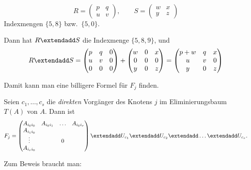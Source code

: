 \begin{bsp}
\begin{equation*}
 R
 =
 \begin{pmatrix}
  p & q \\
  u & v
 \end{pmatrix},
 \qquad
 S
 =
 \begin{pmatrix}
  w & x \\
  y & z
 \end{pmatrix}
\end{equation*}
Indexmengen $\{5,8\}$ bzw.\ $\{5,0\}$.

Dann hat $R \extendadd S$ die Indexmenge $\lbrace 5,8,9 \rbrace$, und
\begin{equation*}
 R \extendadd S
 =
 \begin{pmatrix}
  p & q & 0 \\
  u & v & 0 \\
  0 & 0 & 0
 \end{pmatrix}
 +
 \begin{pmatrix}
  w & 0 & x \\
  0 & 0 & 0 \\
  y & 0 & z
 \end{pmatrix}
 =
 \begin{pmatrix}
  p+w & q & x \\
  u & v & 0 \\
  y & 0 & z
 \end{pmatrix}
\end{equation*}
\end{bsp}
Damit kann man eine billigere Formel für $F_j$ finden.
\begin{satz}
\label{thm:frontal_matrix_children}
Seien $c_1, \ldots,c_s$ die \emph{direkten} Vorgänger des Knotens $j$ im Eliminierungsbaum $T(A)$ von $A$. Dann ist
\begin{equation*}
 F_j
 =
 \begin{pmatrix}
  A_{{i_0}{i_0}} & A_{{i_0}{i_1}} & \ldots & A_{{i_0}{i_r}} \\
  A_{{i_1}{i_0}} \\
  \vdots & & 0 \\
  A_{{i_r}{i_0}}
 \end{pmatrix} \extendadd U_{c_1} \extendadd U_{c_2} \extendadd \ldots \extendadd U_{c_s}.
\end{equation*}
\end{satz}

Zum Beweis braucht man:

